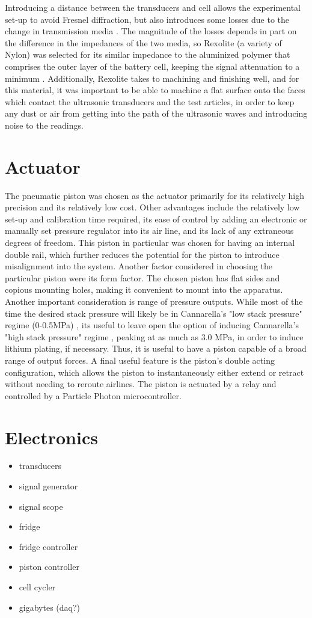 Introducing a distance between the transducers and cell allows the experimental set-up to avoid Fresnel diffraction, but also introduces some losses due to the change in transmission media . The magnitude of the losses depends in part on the difference in the impedances of the two media, so Rexolite (a variety of Nylon) was selected for its similar impedance to the aluminized polymer that comprises the outer layer of the battery cell, keeping the signal attenuation to a minimum . 
Additionally, Rexolite takes to machining and finishing well, and for this material, it was important to be able to machine a flat surface onto the faces which contact the ultrasonic transducers and the test articles, in order to keep any dust or air from getting into the path of the ultrasonic waves and introducing noise to the readings.
 
\section{Actuator}
The pneumatic piston was chosen as the actuator primarily for its relatively high precision and its relatively low cost. Other advantages include the relatively low set-up and calibration time required, its ease of control by adding an electronic or manually set pressure regulator into its air line, and its lack of any extraneous degrees of freedom. This piston in particular was chosen for having an internal double rail, which further reduces the potential for the piston to introduce misalignment into the system. Another factor considered in choosing the particular piston were its form factor. The chosen piston has flat sides and copious mounting holes, making it convenient to mount into the apparatus. Another important consideration is range of pressure outputs. While most of the time the desired stack pressure will likely be in Cannarella's "low stack pressure" regime (0-0.5MPa) \cite{STACK-STRESS}, its useful to leave open the option of inducing Cannarella's "high stack pressure" regime \cite{STACK-STRESS}, peaking at as much as 3.0 MPa, in order to induce lithium plating, if necessary.  Thus, it is useful to have a piston capable of a broad range of output forces. A final useful feature is the piston's double acting configuration, which allows the piston to instantaneously either extend or retract without needing to reroute airlines. The piston is actuated by a relay and controlled by a Particle Photon microcontroller.

\section{Electronics}
\begin{itemize}
    \item transducers
    \item signal generator
    \item signal scope
    \item fridge 
    \item fridge controller
    \item piston controller
    \item cell cycler
    \item gigabytes (daq?)
\end{itemize}